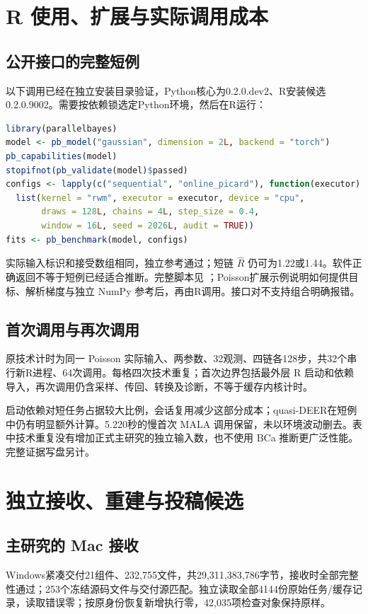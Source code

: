 \documentclass[UTF8,zihao=-4,a4paper,fontset=fandol]{ctexart}
\begin{document}
\clearpage
\section{R 使用、扩展与实际调用成本}
\subsection{公开接口的完整短例}
以下调用已经在独立安装目录验证，Python核心为0.2.0.dev2、R安装候选0.2.0.9002。需要按依赖锁选定Python环境，然后在R运行：
\begin{lstlisting}[language=R]
library(parallelbayes)
model <- pb_model("gaussian", dimension = 2L, backend = "torch")
pb_capabilities(model)
stopifnot(pb_validate(model)$passed)
configs <- lapply(c("sequential", "online_picard"), function(executor)
  list(kernel = "rwm", executor = executor, device = "cpu",
       draws = 128L, chains = 4L, step_size = 0.4,
       window = 16L, seed = 2026L, audit = TRUE))
fits <- pb_benchmark(model, configs)
\end{lstlisting}
实际输入标识和接受数组相同，独立参考通过；短链 $\hat R$ 仍可为1.22或1.44。软件正确返回不等于短例已经适合推断。完整脚本见 ；Poisson扩展示例说明如何提供目标、解析梯度与独立 NumPy 参考后，再由R调用。接口对不支持组合明确报错。

\subsection{首次调用与再次调用}
原技术计时为同一 Poisson 实际输入、两参数、32观测、四链各128步，共32个串行新R进程、64次调用。每格四次技术重复；首次边界包括最外层 R 启动和依赖导入，再次调用仍含采样、传回、转换及诊断，不等于缓存内核计时。

启动依赖对短任务占据较大比例，会话复用减少这部分成本；quasi-DEER在短例中仍有明显额外计算。5.220秒的慢首次 MALA 调用保留，未以环境波动删去。表中技术重复没有增加正式主研究的独立输入数，也不使用 BCa 推断更广泛性能。完整证据写盘另计。

\section{独立接收、重建与投稿候选}
\subsection{主研究的 Mac 接收}
Windows紧凑交付21组件、232,755文件，共29,311,383,786字节，接收时全部完整性通过；253个冻结源码文件与交付源匹配。独立读取全部4144份原始任务/缓存记录，读取错误零；按原身份恢复新增执行零，42,035项检查对象保持原样。
\end{document}
